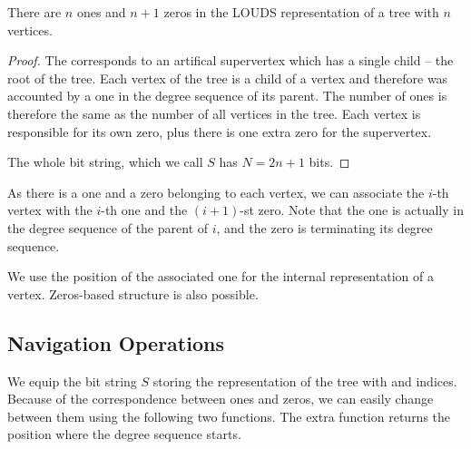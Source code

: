 \begin{lemma}
	There are $n$ ones and $n+1$ zeros in the LOUDS representation of a tree with $n$ vertices.
\end{lemma}
\begin{proof}
	The  corresponds to an artifical supervertex which has a single child -- the root of the tree.
	Each vertex of the tree is a child of a vertex and therefore was accounted by a one in the degree sequence of its parent.
	The number of ones is therefore the same as the number of all vertices in the tree.
	Each vertex is responsible for its own zero, plus there is one extra zero for the supervertex.
	
	The whole bit string, which we call $S$ has $N = 2n + 1$ bits.
\end{proof}

As there is a one and a zero belonging to each vertex, we can associate the $i$-th vertex with the $i$-th one and the $(i+1)$-st zero.
Note that the one is actually in the degree sequence of the parent of $i$, and the zero is terminating its degree sequence.

We use the position of the associated one for the internal representation of a vertex.
Zeros-based structure is also possible. \cite{rahman2006engineering}

\subsection{Navigation Operations}

We equip the bit string $S$ storing the representation of the tree with \rank{} and \select{} indices.
Because of the correspondence between ones and zeros, we can easily change between them using the following two functions.
The extra function \toBeginning{} returns the position where the degree sequence starts.

\begin{algorithmic}
	\State {}
\EndFunction
\end{algorithmic}

\begin{algorithmic}
	\State {}
\EndFunction
\end{algorithmic}

\begin{algorithmic}
	\State {}
\EndFunction
\end{algorithmic}

